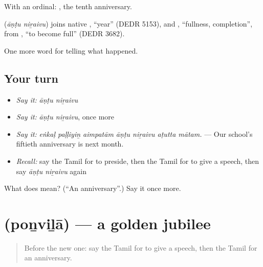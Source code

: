 With an ordinal:   , the tenth anniversary.

\begin{cousinweb}
\textbf{ } (\emph{āṇṭu niṟaivu}) joins native , \textquotedblleft{}year\textquotedblright{} (DEDR 5153), and , \textquotedblleft{}fullness, completion\textquotedblright{}, from , \textquotedblleft{}to become full\textquotedblright{} (DEDR 3682).
\end{cousinweb}

\begin{grammarlens}[title={What you've built}]
One more word for telling what happened.
\end{grammarlens}

\subsection*{Your turn}
\begin{itemize}
\raggedright
  \item \emph{Say it:} \emph{āṇṭu niṟaivu}
  \item \emph{Say it:} \emph{āṇṭu niṟaivu}, once more
  \item \emph{Say it:} \emph{eṅkaḷ paḷḷiyiṉ aimpatām āṇṭu niṟaivu aṭutta mātam.} — Our school's fiftieth anniversary is next month.
  \item \emph{Recall:} say the Tamil for to preside, then the Tamil for to give a speech, then say \emph{āṇṭu niṟaivu} again
\end{itemize}

\begin{tcolorbox}[breakable,colback=teal!4,colframe=teal!35!black,title={Before you move on}]
What does   mean? (\textquotedblleft{}An anniversary\textquotedblright{}.) Say it once more.
\end{tcolorbox}
\section[\texorpdfstring{\ta{பொன்விழா} (poṉviḻā)}{பொன்விழா (poṉviḻā)}]{ (poṉviḻā) — a golden jubilee}

\label{lesson:TA-C319-ponvila}



\begin{quote}
Before the new one: say the Tamil for to give a speech, then the Tamil for an anniversary.
\end{quote}

